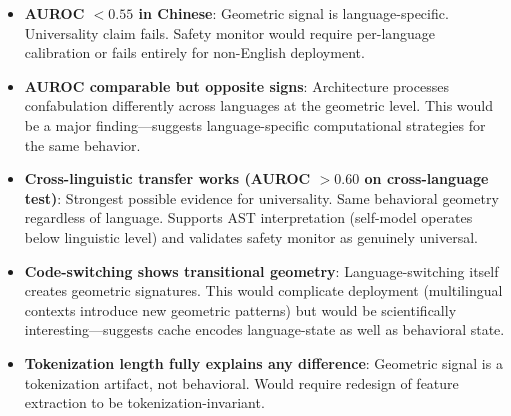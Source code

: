 \documentclass[11pt,letterpaper]{article}
\begin{document}
\begin{itemize}
  \item \textbf{AUROC $< 0.55$ in Chinese}: Geometric signal is language-specific. Universality claim fails. Safety monitor would require per-language calibration or fails entirely for non-English deployment.

  \item \textbf{AUROC comparable but opposite signs}: Architecture processes confabulation differently across languages at the geometric level. This would be a major finding---suggests language-specific computational strategies for the same behavior.

  \item \textbf{Cross-linguistic transfer works (AUROC $> 0.60$ on cross-language test)}: Strongest possible evidence for universality. Same behavioral geometry regardless of language. Supports AST interpretation (self-model operates below linguistic level) and validates safety monitor as genuinely universal.

  \item \textbf{Code-switching shows transitional geometry}: Language-switching itself creates geometric signatures. This would complicate deployment (multilingual contexts introduce new geometric patterns) but would be scientifically interesting---suggests cache encodes language-state as well as behavioral state.

  \item \textbf{Tokenization length fully explains any difference}: Geometric signal is a tokenization artifact, not behavioral. Would require redesign of feature extraction to be tokenization-invariant.
\end{itemize}
\end{document}
